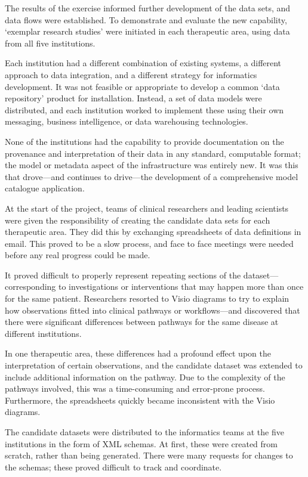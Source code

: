 The results of the exercise informed further development of the data
sets, and data flows were established.  To demonstrate and evaluate
the new capability, `exemplar research studies' were initiated in each
therapeutic area, using data from all five institutions.  

Each institution had a different combination of existing systems, a
different approach to data integration, and a different strategy for
informatics development.  It was not feasible or appropriate to
develop a common `data repository' product for installation.  Instead,
a set of data models were distributed, and each institution worked to
implement these using their own messaging, business intelligence, or
data warehousing technologies. 

None of the institutions had the capability to provide documentation
on the provenance and interpretation of their data in any standard,
computable format; the model or metadata aspect of the infrastructure
was entirely new.  It was this that drove---and continues to
drive---the development of a comprehensive model catalogue
application. 

At the start of the project, teams of clinical researchers and leading
scientists were given the responsibility of creating the candidate
data sets for each therapeutic area.  They did this by exchanging
spreadsheets of data definitions in email.  This proved to be a slow
process, and face to face meetings were needed before any real
progress could be made.

It proved difficult to properly represent repeating sections of the
dataset---corresponding to investigations or interventions that may
happen more than once for the same patient.  Researchers resorted to
Visio diagrams to try to explain how observations fitted into clinical
pathways or workflows---and discovered that there were significant
differences between pathways for the same disease at different
institutions.  

In one therapeutic area, these differences had a profound effect upon
the interpretation of certain observations, and the candidate dataset
was extended to include additional information on the pathway.  Due to
the complexity of the pathways involved, this was a time-consuming and
error-prone process.  Furthermore, the spreadsheets quickly became
inconsistent with the Visio diagrams.

The candidate datasets were distributed to the informatics teams at
the five institutions in the form of XML schemas.  At first, these
were created from scratch, rather than being generated.  There were
many requests for changes to the schemas; these proved difficult to
track and coordinate.

